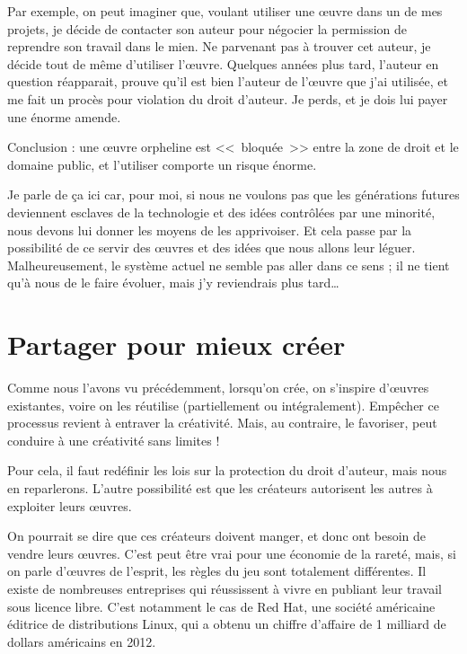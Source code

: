 Par exemple, on peut imaginer que, voulant utiliser une œuvre dans un de mes projets, je décide de contacter son auteur pour négocier la permission de reprendre son travail dans le mien.
Ne parvenant pas à trouver cet auteur, je décide tout de même d'utiliser l'œuvre.
Quelques années plus tard, l'auteur en question réapparait, prouve qu'il est bien l'auteur de l'œuvre que j'ai utilisée, et me fait un procès pour violation du droit d'auteur.
Je perds, et je dois lui payer une énorme amende.

Conclusion : une œuvre orpheline est <<~bloquée~>> entre la zone de droit et le domaine public, et l'utiliser comporte un risque énorme.

Je parle de ça ici car, pour moi, si nous ne voulons pas que les générations futures deviennent esclaves de la technologie et des idées contrôlées par une minorité, nous devons lui donner les moyens de les apprivoiser.
Et cela passe par la possibilité de ce servir des œuvres et des idées que nous allons leur léguer.
Malheureusement, le système actuel ne semble pas aller dans ce sens ; il ne tient qu'à nous de le faire évoluer, mais j'y reviendrais plus tard\dots{}

\section{Partager pour mieux créer}

Comme nous l'avons vu précédemment, lorsqu'on crée, on s'inspire d'œuvres existantes, voire on les réutilise (partiellement ou intégralement).
Empêcher ce processus revient à entraver la créativité.
Mais, au contraire, le favoriser, peut conduire à une créativité sans limites !

Pour cela, il faut redéfinir les lois sur la protection du droit d'auteur, mais nous en reparlerons.
L'autre possibilité est que les créateurs autorisent les autres à exploiter leurs œuvres.

On pourrait se dire que ces créateurs doivent manger, et donc ont besoin de vendre leurs œuvres.
C'est peut être vrai pour une économie de la rareté, mais, si on parle d'œuvres de l'esprit, les règles du jeu sont totalement différentes.
Il existe de nombreuses entreprises qui réussissent à vivre en publiant leur travail sous licence libre.
C'est notamment le cas de Red Hat, une société américaine éditrice de distributions Linux, qui a obtenu un chiffre d'affaire de 1 milliard de dollars américains en 2012.

